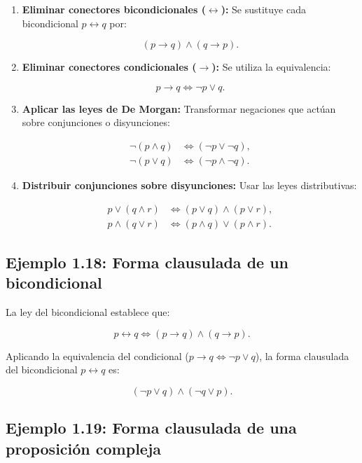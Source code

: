\begin{enumerate}
    \item \textbf{Eliminar conectores bicondicionales
      (\(\leftrightarrow\)):} Se sustituye cada bicondicional \(p
      \leftrightarrow q\) por:

    \[ (p \to q) \land (q \to p). \]

    \item \textbf{Eliminar conectores condicionales (\(\to\)):} Se utiliza
    la equivalencia:

    \[ p \to q \iff \neg p \lor q. \]

    \item \textbf{Aplicar las leyes de De Morgan:} Transformar negaciones
    que actúan sobre conjunciones o disyunciones:

    \begin{align*}
        \neg (p \land q) &\iff (\neg p \lor \neg q), \\
        \neg (p \lor q) &\iff (\neg p \land \neg q).
    \end{align*}

    \item \textbf{Distribuir conjunciones sobre disyunciones:} Usar las
    leyes distributivas:

    \begin{align*}
        p \lor (q \land r) &\iff (p \lor q) \land (p \lor r), \\
        p \land (q \lor r) &\iff (p \land q) \lor (p \land r).
    \end{align*}
\end{enumerate}

\subsection{Ejemplo 1.18: Forma clausulada de un bicondicional}

La ley del bicondicional establece que:

\[ p \leftrightarrow q \iff (p \to q) \land (q \to p). \]

Aplicando la equivalencia del condicional (\(p \to q \iff \neg p \lor q\)),
la forma clausulada del bicondicional \(p \leftrightarrow q\) es:

\[ (\neg p \lor q) \land (\neg q \lor p). \]



\subsection{Ejemplo 1.19: Forma clausulada de una proposición compleja}

